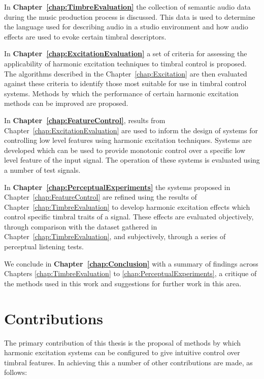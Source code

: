 	In {\bf{Chapter~\ref{chap:TimbreEvaluation}}} the collection of semantic audio data during the music production
	process is discussed. This data is used to determine the language used for describing audio in a studio environment
	and how audio effects are used to evoke certain timbral descriptors.

	In {\bf{Chapter~\ref{chap:ExcitationEvaluation}}} a set of criteria for assessing the applicability of harmonic
	excitation techniques to timbral control is proposed. The algorithms described in the Chapter~\ref{chap:Excitation}
	are then evaluated against these criteria to identify those most suitable for use in timbral control systems.
	Methods by which the performance of certain harmonic excitation methods can be improved are proposed.

	In {\bf{Chapter~\ref{chap:FeatureControl}}}, results from Chapter~\ref{chap:ExcitationEvaluation} are used to inform
	the design of systems for controlling low level features using harmonic excitation techniques. Systems are developed
	which can be used to provide monotonic control over a specific low level feature of the input signal. The operation
	of these systems is evaluated using a number of test signals.

	In {\bf{Chapter~\ref{chap:PerceptualExperiments}}} the systems proposed in Chapter~\ref{chap:FeatureControl} are
	refined using the results of Chapter~\ref{chap:TimbreEvaluation} to develop harmonic excitation effects which
	control specific timbral traits of a signal. These effects are evaluated objectively, through comparison with the
	dataset gathered in Chapter~\ref{chap:TimbreEvaluation}, and subjectively, through a series of perceptual listening
	tests.

	We conclude in {\bf{Chapter~\ref{chap:Conclusion}}} with a summary of findings across Chapters
	\ref{chap:TimbreEvaluation} to \ref{chap:PerceptualExperiments}, a critique of the methods used in this work and
	suggestions for further work in this area.

\section{Contributions}
\label{sec:Introduction-Contributions}
	The primary contribution of this thesis is the proposal of methods by which harmonic excitation systems can be
	configured to give intuitive control over timbral features. In achieving this a number of other contributions are
	made, as follows:

